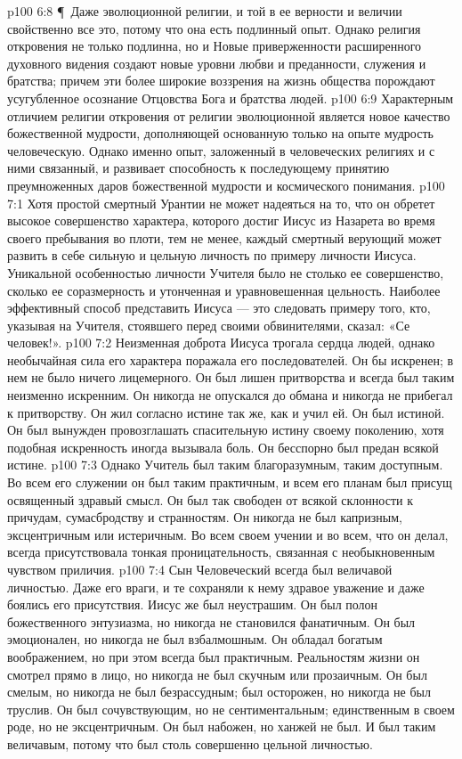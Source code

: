 \vs p100 6:8 \P\ Даже эволюционной религии, и той в ее верности и величии свойственно все это, потому что она есть подлинный опыт. Однако религия откровения не только подлинна, но и  Новые приверженности расширенного духовного видения создают новые уровни любви и преданности, служения и братства; причем эти более широкие воззрения на жизнь общества порождают усугубленное осознание Отцовства Бога и братства людей.
\vs p100 6:9 Характерным отличием религии откровения от религии эволюционной является новое качество божественной мудрости, дополняющей основанную только на опыте мудрость человеческую. Однако именно опыт, заложенный в человеческих религиях и с ними связанный, и развивает способность к последующему принятию преумноженных даров божественной мудрости и космического понимания.
\vs p100 7:1 Хотя простой смертный Урантии не может надеяться на то, что он обретет высокое совершенство характера, которого достиг Иисус из Назарета во время своего пребывания во плоти, тем не менее, каждый смертный верующий может развить в себе сильную и цельную личность по примеру личности Иисуса. Уникальной особенностью личности Учителя было не столько ее совершенство, сколько ее соразмерность и утонченная и уравновешенная цельность. Наиболее эффективный способ представить Иисуса --- это следовать примеру того, кто, указывая на Учителя, стоявшего перед своими обвинителями, сказал: «Се человек!».
\vs p100 7:2 Неизменная доброта Иисуса трогала сердца людей, однако необычайная сила его характера поражала его последователей. Он бы искренен; в нем не было ничего лицемерного. Он был лишен притворства и всегда был таким неизменно искренним. Он никогда не опускался до обмана и никогда не прибегал к притворству. Он жил согласно истине так же, как и учил ей. Он был истиной. Он был вынужден провозглашать спасительную истину своему поколению, хотя подобная искренность иногда вызывала боль. Он бесспорно был предан всякой истине.
\vs p100 7:3 Однако Учитель был таким благоразумным, таким доступным. Во всем его служении он был таким практичным, и всем его планам был присущ освященный здравый смысл. Он был так свободен от всякой склонности к причудам, сумасбродству и странностям. Он никогда не был капризным, эксцентричным или истеричным. Во всем своем учении и во всем, что он делал, всегда присутствовала тонкая проницательность, связанная с необыкновенным чувством приличия.
\vs p100 7:4 Сын Человеческий всегда был величавой личностью. Даже его враги, и те сохраняли к нему здравое уважение и даже боялись его присутствия. Иисус же был неустрашим. Он был полон божественного энтузиазма, но никогда не становился фанатичным. Он был эмоционален, но никогда не был взбалмошным. Он обладал богатым воображением, но при этом всегда был практичным. Реальностям жизни он смотрел прямо в лицо, но никогда не был скучным или прозаичным. Он был смелым, но никогда не был безрассудным; был осторожен, но никогда не был труслив. Он был сочувствующим, но не сентиментальным; единственным в своем роде, но не эксцентричным. Он был набожен, но ханжей не был. И был таким величавым, потому что был столь совершенно цельной личностью.
